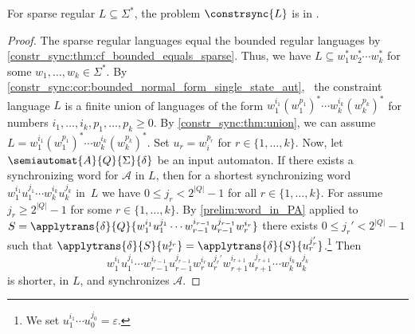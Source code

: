 
\begin{theorem}
	\label{sparse:thm:bounded_in_NP}
	For sparse regular $L \subseteq \Sigma^*$,
	the problem $\constrsync{L}$ is in \NP.
\end{theorem}
\begin{proof}
	The sparse regular languages equal the bounded regular languages
	by \cref{constr_sync:thm:cf_bounded_equals_sparse}.
	Thus, we have $L \subseteq w_1^* w_2^* \cdots w_k^*$
	for some $w_1, \ldots, w_k \in \Sigma^*$.	
	By \cref{constr_sync:cor:bounded_normal_form_single_state_aut}, \
	the constraint language $L$
	is a finite union of languages of the form 
	 $w_1^{i_1} (w_1^{p_1})^* \cdots w_k^{i_k} (w_k^{p_k})^*$
	for numbers $i_1, \ldots, i_k, p_1, \ldots, p_k \ge 0$.	
	By \cref{constr_sync:thm:union},
	we can assume $L = w_1^{i_1} (w_1^{p_1})^* \cdots w_k^{i_k} (w_k^{p_k})^*$.
	Set $u_r = w_i^{p_r}$ for $r \in \{1,\ldots,k\}$.	
	Now, let $\semiautomat{A}{Q}{\Sigma}{\delta}$
	be an input automaton.
	If there exists a synchronizing word for $\mathcal A$ 
	in $L$,
    then for a shortest synchronizing
    word $w_1^{i_1} u_1^{j_1} \cdots w_k^{i_k} u_k^{j_k}$ in~$L$
    we have $0 \le j_r < 2^{|Q|} - 1$ for all $r \in \{1,\ldots,k\}$.
	For assume $j_r \ge 2^{|Q|} -1$
	for some $r \in \{1,\ldots,k\}$.
	By \cref{prelim:word_in_PA}
	applied to $S = \applytrans{\delta}{Q}{w_1^{i_1} u_1^{j_1} \cdots w_{r-1}^{i_{r-1}} u_{r-1}^{j_{r-1}} w_r^{i_r}}$
	there exists $0 \le j_r' < 2^{|Q|} - 1$
	such that $\applytrans{\delta}{S}{u_r^{j_r}} = \applytrans{\delta}{S}{u_r^{j_r'}}$.\footnote{We set
		$u_1^{i_1} \cdots u_{0}^{j_{0}} = \varepsilon$.}
	Then 
	\[
	 w_1^{i_1} u_1^{j_1} \cdots w_{r-1}^{i_{r-1}} u_{r-1}^{j_{r-1}} w_r^{i_r} u_r^{j_r'} w_{r+1}^{i_{r+1}} u_{r+1}^{j_{r+1}} \cdots w_k^{i_k} u_k^{j_k}
	\]
	is shorter, in $L$, and synchronizes $\mathcal A$.	
	

\end{proof}
